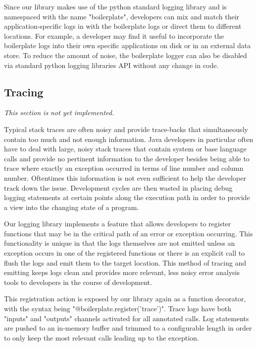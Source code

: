 \documentclass[acmsmall,review,authorversion]{acmart}
\begin{document}
Since our library makes use of the python standard logging library and is namespaced with the name "boilerplate", developers can mix and match their application-specific logs in with the boilerplate logs or direct them to different locations. For example, a developer may find it useful to incorporate the boilerplate logs into their own specific applications on disk or in an external data store. To reduce the amount of noise, the boilerplate logger can also be disabled via standard python logging libraries API without any change in code.

\subsection{Tracing}

\textit{This section is not yet implemented.}

Typical stack traces are often noisy and provide trace-backs that simultaneously contain too much and not enough information. Java developers in particular often have to deal with large, noisy stack traces that contain system or base language calls and provide no pertinent information to the developer besides being able to trace where exactly an exception occurred in terms of line number and column number. Oftentimes this information is not even sufficient to help the developer track down the issue. Development cycles are then wasted in placing debug logging statements at certain points along the execution path in order to provide a view into the changing state of a program.

Our logging library implements a feature that allows developers to register functions that may be in the critical path of an error or exception occurring. This functionality is unique in that the logs themselves are not emitted unless an exception occurs in one of the registered functions or there is an explicit call to flush the logs and emit them to the target location. This method of tracing and emitting keeps logs clean and provides more relevant, less noisy error analysis tools to developers in the course of development.

This registration action is exposed by our library again as a function decorator, with the syntax being "@boilerplate.register('trace')". Trace logs have both "inputs" and "outputs" channels activated for all annotated calls. Log statements are pushed to an in-memory buffer and trimmed to a configurable length in order to only keep the most relevant calls leading up to the exception.
\end{document}
